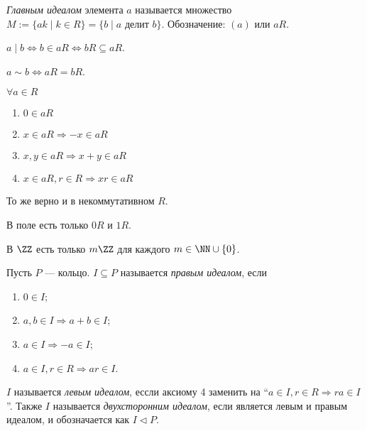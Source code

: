 \documentclass[12pt,a4paper]{article}
\begin{document}
    \begin{definition}
        \emph{Главным идеалом} элемента $a$ называется множество $M := \{ak \mid k \in R\} = \{b \mid a \text{ делит } b\}$. Обозначение: $(a)$ или $aR$.
    \end{definition}

    \begin{statement}
        $a \mid b \Leftrightarrow b \in aR \Leftrightarrow bR \subseteq aR$. 
    \end{statement}

    \begin{statement}
        $a \sim b \Leftrightarrow aR = bR$.
    \end{statement}

    \begin{statement}$\forall a \in R$
        \begin{enumerate}
            \item $0 \in aR$
            \item $x \in aR \Rightarrow -x \in aR$
            \item $x, y \in aR \Rightarrow x + y \in aR$
            \item $x \in aR, r \in R \Rightarrow xr \in aR$
        \end{enumerate}
    \end{statement}

    \begin{remark}
        То же верно и в некоммутативном $R$.
    \end{remark}

    \begin{example}
        В поле есть только $0R$ и $1R$.
    \end{example}

    \begin{example}
        В $\ZZ$ есть только $m\ZZ$ для каждого $m \in \NN \cup \{0\}$.
    \end{example}

    \begin{definition}
        Пусть $P$ --- кольцо. $I\subseteq P$ называется \emph{правым идеалом}, если
        \begin{enumerate}
            \item $0 \in I$;
            \item $a, b \in I \Rightarrow a + b \in I$;
            \item $a \in I \Rightarrow -a \in I$;
            \item $a \in I, r \in R \Rightarrow ar \in I$.
        \end{enumerate}
        $I$ называется \emph{левым идеалом}, ессли аксиому 4 заменить на ``$a \in I, r \in R \Rightarrow ra \in I$''. Также $I$ называется \emph{двухсторонним идеалом}, если является левым и правым идеалом, и обозначается как $I \triangleleft P$.
    \end{definition}
\end{document}
